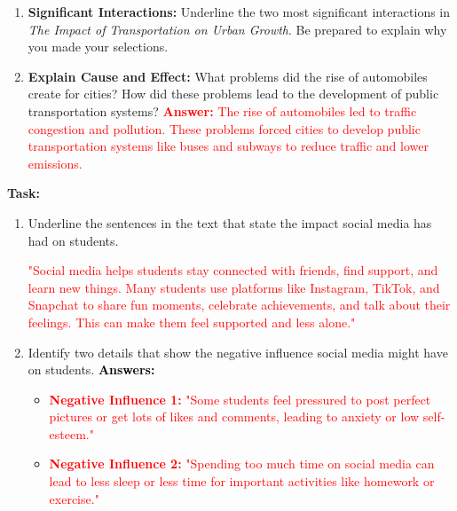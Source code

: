 \documentclass[12pt]{article}
\begin{document}
\vspace{2em}

\begin{tcolorbox}[colframe=black!60, colback=white, 
coltitle=black, colbacktitle=black!15, fonttitle=\bfseries\Large, 
title=Guided Practice, halign title=center, left=10pt, right=10pt, top=10pt, bottom=15pt]
\begin{enumerate}[itemsep=1em]
    \item \textbf{Significant Interactions:} Underline the two most significant interactions in \textit{The Impact of Transportation on Urban Growth}. Be prepared to explain why you made your selections.  
    \item \textbf{Explain Cause and Effect:} What problems did the rise of automobiles create for cities? How did these problems lead to the development of public transportation systems?  
    \textcolor{red}{\textbf{Answer:}} \textcolor{red}{The rise of automobiles led to traffic congestion and pollution. These problems forced cities to develop public transportation systems like buses and subways to reduce traffic and lower emissions.}
\end{enumerate}
\end{tcolorbox}

\vspace{2em}

\begin{tcolorbox}[colframe=black!60, colback=white, 
coltitle=black, colbacktitle=black!15, fonttitle=\bfseries\Large, 
title=Independent Practice, halign title=center, left=10pt, right=10pt, bottom=15pt]

\textbf{Task:}  
\begin{enumerate}[itemsep=1em]
    \item Underline the sentences in the text that state the impact social media has had on students. 


\textcolor{red}{"Social media helps students stay connected with friends, find support, and learn new things. Many students use platforms like Instagram, TikTok, and Snapchat to share fun moments, celebrate achievements, and talk about their feelings. This can make them feel supported and less alone."}

    
    \item Identify two details that show the negative influence social media might have on students.  
    \textcolor{black}{\textbf{Answers:}}  
    \begin{itemize}
        \item \textbf{\textcolor{red}{Negative Influence 1:}} \textcolor{red}{"Some students feel pressured to post perfect pictures or get lots of likes and comments, leading to anxiety or low self-esteem."}  
        \item \textbf{\textcolor{red}{Negative Influence 2:}} \textcolor{red}{"Spending too much time on social media can lead to less sleep or less time for important activities like homework or exercise."}  
    \end{itemize}
\end{enumerate}
\end{tcolorbox}
\end{document}
